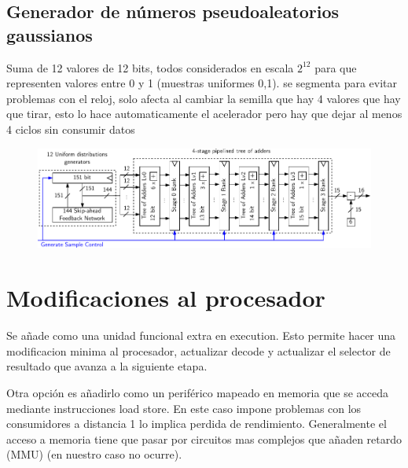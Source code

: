 \subsection{Generador de números pseudoaleatorios gaussianos}

\todo Suma de 12 valores de 12 bits, todos considerados en escala $2^{12}$ para que representen valores entre 0 y 1 (muestras uniformes 0,1). se segmenta para evitar problemas con el reloj, solo afecta al cambiar la semilla que hay 4 valores que hay que tirar, esto lo hace automaticamente el acelerador pero hay que dejar al menos 4 ciclos sin consumir datos

\begin{figure}[h]
    \centering
    \includegraphics[width=\textwidth]{Imagenes/grng.pdf}
    \caption{\todo}
    \label{fig:aa}
\end{figure}

\section{Modificaciones al procesador}

Se añade como una unidad funcional extra en execution. Esto permite hacer una modificacion minima al procesador, actualizar decode y actualizar el selector de resultado que avanza a la siguiente etapa.

Otra opción es añadirlo como un periférico mapeado en memoria que se acceda mediante instrucciones load store. En este caso impone problemas con los consumidores a distancia 1 lo implica perdida de rendimiento. Generalmente el acceso a memoria tiene que pasar por circuitos mas complejos que añaden retardo (MMU) (en nuestro caso no ocurre).

